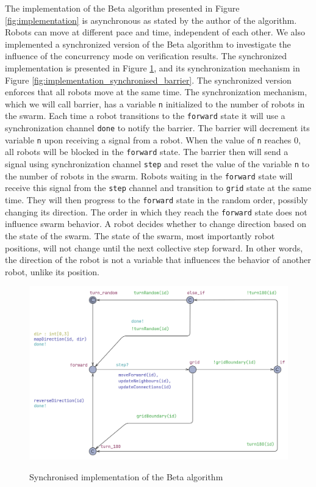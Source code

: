 \noindent
The implementation of the Beta algorithm presented in Figure \ref{fig:implementation} is asynchronous as stated by the author of the algorithm. Robots can move at different pace and time, independent of each other. We also implemented a synchronized version of the Beta algorithm to investigate the influence of the concurrency mode on verification results. The synchronized implementation is presented in Figure \ref{fig:implementation_synchronised}, and its synchronization mechanism in Figure \ref{fig:implementation_synchronised_barrier}. The synchronized version enforces that all robots move at the same time. The synchronization mechanism, which we will call barrier, has a variable \texttt{n} initialized to the number of robots in the swarm. Each time a robot transitions to the \texttt{forward} state it will use a synchronization channel \texttt{done} to notify the barrier. The barrier will decrement its variable \texttt{n} upon receiving a signal from a robot. When the value of \texttt{n} reaches 0, all robots will be blocked in the \texttt{forward} state. The barrier then will send a signal using synchronization channel \texttt{step} and reset the value of the variable \texttt{n} to the number of robots in the swarm. Robots waiting in the \texttt{forward} state will receive this signal from the \texttt{step} channel and transition to \texttt{grid} state at the same time. They will then progress to the \texttt{forward} state in the random order, possibly changing its direction. The order in which they reach the \texttt{forward} state does not influence swarm behavior. A robot decides whether to change direction based on the state of the swarm. The state of the swarm, most importantly robot positions, will not change until the next collective step forward. In other words, the direction of the robot is not a variable that influences the behavior of another robot, unlike its position. 

\begin{figure}[H]
\caption{Synchronised implementation of the Beta algorithm}
\includegraphics[width=\textwidth]{images/implementation_synchronised.png}
\label{fig:implementation_synchronised}
\end{figure}

